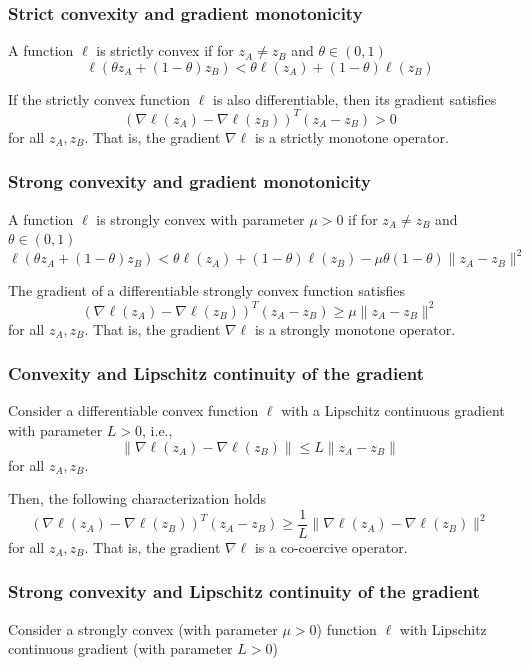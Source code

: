 \documentclass[openany]{book}
\theoremstyle{definition}
\theoremstyle{remark}
\begin{document}
\subsubsection{Strict convexity and gradient monotonicity}
A function $\ell$ is strictly convex if for $z_A \neq z_B$ and $\theta \in (0,1)$
\[
    \ell(\theta z_A + (1-\theta)z_B) < \theta\ell(z_A) + (1-\theta)\ell(z_B)
\]

If the strictly convex function $\ell$ is also differentiable, then its gradient satisfies
\[
    (\nabla\ell(z_A) - \nabla\ell(z_B))^T(z_A - z_B) > 0
\]
for all $z_A, z_B$. That is, the gradient $\nabla\ell$ is a strictly monotone operator.

\subsubsection{Strong convexity and gradient monotonicity}
A function $\ell$ is strongly convex with parameter $\mu > 0$ if for $z_A \neq z_B$ and $\theta \in (0,1)$
\[
    \ell(\theta z_A + (1-\theta)z_B) < \theta\ell(z_A) + (1-\theta)\ell(z_B) - \mu\theta(1-\theta)\|z_A - z_B\|^2
\]

The gradient of a differentiable strongly convex function satisfies
\[
    (\nabla\ell(z_A) - \nabla\ell(z_B))^T(z_A - z_B) \geq \mu\|z_A - z_B\|^2
\]
for all $z_A, z_B$. That is, the gradient $\nabla\ell$ is a strongly monotone operator.

\subsubsection{Convexity and Lipschitz continuity of the gradient}
Consider a differentiable convex function $\ell$ with a Lipschitz continuous gradient with parameter $L > 0$, i.e.,
\[
    \|\nabla\ell(z_A) - \nabla\ell(z_B)\| \leq L\|z_A - z_B\|
\]
for all $z_A, z_B$.

Then, the following characterization holds
\[
    (\nabla\ell(z_A) - \nabla\ell(z_B))^T(z_A - z_B) \geq \frac{1}{L}\|\nabla\ell(z_A) - \nabla\ell(z_B)\|^2
\]
for all $z_A, z_B$. That is, the gradient $\nabla\ell$ is a co-coercive operator.

\subsubsection{Strong convexity and Lipschitz continuity of the gradient}
Consider a strongly convex (with parameter $\mu > 0$) function $\ell$ with Lipschitz continuous gradient (with parameter $L > 0$)
\end{document}
